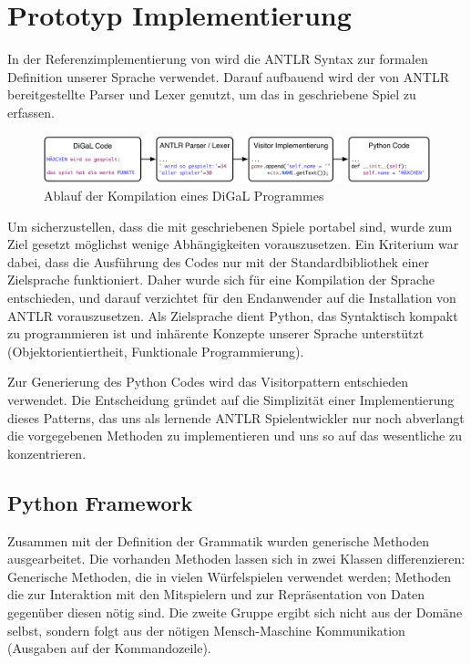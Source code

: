 
\chapter{Prototyp Implementierung}
\label{cha:implementierung}
In der Referenzimplementierung von \dg wird die ANTLR Syntax zur formalen Definition unserer Sprache verwendet. Darauf aufbauend wird der von ANTLR bereitgestellte Parser und Lexer genutzt, um das in \dg geschriebene Spiel zu erfassen.\\

\begin{figure}[ht]
	\centering
	\includegraphics[width=\textwidth]{Flow.pdf}
	\caption{Ablauf der Kompilation eines DiGaL Programmes}
	\label{flow}
\end{figure}

Um sicherzustellen, dass die mit \dg geschriebenen Spiele portabel sind, wurde zum Ziel gesetzt möglichst wenige Abhängigkeiten vorauszusetzen. Ein Kriterium war dabei, dass die Ausführung des Codes nur mit der Standardbibliothek einer Zielsprache funktioniert. Daher wurde sich für eine Kompilation der Sprache entschieden, und darauf verzichtet für den Endanwender auf die Installation von ANTLR vorauszusetzen. Als Zielsprache dient Python, das Syntaktisch kompakt zu programmieren ist und inhärente Konzepte unserer Sprache unterstützt (Objektorientiertheit, Funktionale Programmierung).

Zur Generierung des Python Codes wird das Visitorpattern entschieden verwendet. Die Entscheidung gründet auf die Simplizität einer Implementierung dieses Patterns, das uns als lernende ANTLR Spielentwickler nur noch abverlangt die vorgegebenen Methoden zu implementieren und uns so auf das wesentliche zu konzentrieren. 

\section{Python Framework}
\label{sec:python_framework}
	Zusammen mit der Definition der Grammatik wurden generische Methoden ausgearbeitet. Die vorhanden Methoden lassen sich in zwei Klassen differenzieren: Generische Methoden, die in vielen Würfelspielen verwendet werden; Methoden die zur Interaktion mit den Mitspielern und zur Repräsentation von Daten gegenüber diesen nötig sind. Die zweite Gruppe ergibt sich nicht aus der Domäne selbst, sondern folgt aus der nötigen Mensch-Maschine Kommunikation (Ausgaben auf der Kommandozeile).

